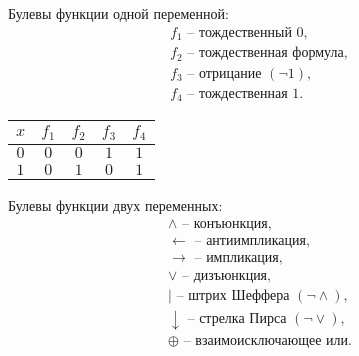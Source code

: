 \begin{note}
    Булевы функции одной переменной:
    \[
        \begin{array}{l}
            f_1\text{ -- тождественный }0,       \\
            f_2\text{ -- тождественная формула}, \\
            f_3\text{ -- отрицание }(\lnot1),    \\
            f_4\text{ -- тождественная 1}.
        \end{array}
    \]

    \begin{center}
        \begin{tabular}{c | c c c c}
            $x$ & $f_1$ & $f_2$ & $f_3$ & $f_4$ \\ [0.5ex]
            \hline
            $0$ & $0$   & $0$   & $1$   & $1$   \\
            $1$ & $0$   & $1$   & $0$   & $1$
        \end{tabular}
        \label{table:2}
    \end{center}

    Булевы функции двух переменных:
    \[
        \begin{array}{l}
            \land\text{ -- конъюнкция},                     \\
            \leftarrow\text{ -- антиимпликация},            \\
            \rightarrow\text{ -- импликация},               \\
            \lor\text{ -- дизъюнкция},                      \\
            \vert\text{ -- штрих Шеффера }(\lnot\land),     \\
            \downarrow\text{ -- стрелка Пирса }(\lnot\lor), \\
            \oplus\text{ -- взаимоисключающее или}.         \\
        \end{array}
    \]


\end{note}
